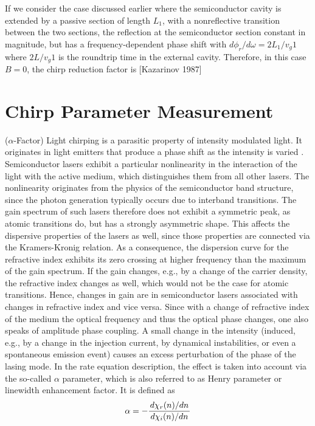 If we consider the case discussed earlier where the semiconductor cavity is extended by a passive section of length $L_1$, with a nonreflective transition between the two sections, the reflection at the semiconductor section constant in magnitude, but has a frequency-dependent phase shift with $d\phi_r/d\omega = 2L_1/v_g1$ where $2L/v_g1$ is the roundtrip time in the external cavity. Therefore, in this case $B=0$, the chirp reduction factor is [Kazarinov 1987]



\section{Chirp Parameter Measurement}\label{sec:chirp_measurement}
($\alpha$-Factor)
Light chirping is a parasitic property of intensity modulated light. It originates in light emitters that produce a phase shift as the intensity is varied \cite{devaux1993simple}. Semiconductor lasers exhibit a particular nonlinearity in the interaction of the light with the active medium, which distinguishes them from all other lasers. The nonlinearity originates from the physics of the semiconductor band structure, since the photon generation typically occurs due to interband transitions. The gain spectrum of such lasers therefore does not exhibit a symmetric peak, as atomic transitions do, but has a strongly asymmetric shape. This affects the dispersive properties of the lasers as well, since those properties are connected via the Kramers-Kronig relation. As a consequence, the dispersion curve for the refractive index exhibits its zero crossing at higher frequency than the maximum of the gain spectrum. If the gain changes, e.g., by a change of the carrier density, the refractive index changes as well, which would not be the case for atomic transitions. Hence, changes in gain are in semiconductor lasers associated with changes in refractive index and vice versa. Since with a change of refractive index of the medium the optical frequency and thus the optical phase changes, one also speaks of amplitude phase coupling. A small change in the intensity (induced, e.g., by a change in the injection current, by dynamical instabilities, or even a spontaneous emission event) causes an excess perturbation of the phase of the lasing mode. In the rate equation description, the effect is taken into account via the so-called $\alpha$ parameter, which is also referred to as Henry parameter or linewidth enhancement factor. It is defined as
\begin{equation}
    \alpha=-\frac{\dv*{\chi_r(n)}{n}}{\dv*{\chi_i(n)}{n}}
\end{equation}


